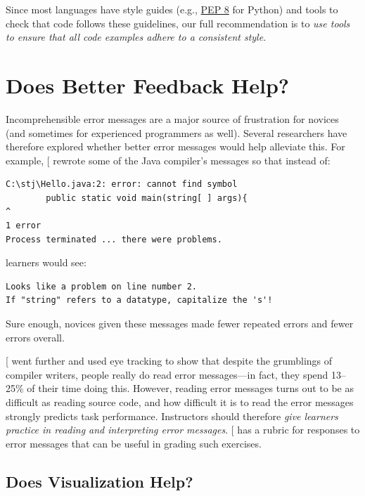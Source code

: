 Since most languages have style guides (e.g., \href{https://www.python.org/dev/peps/pep-0008/}{PEP 8} for
Python) and tools to check that code follows these guidelines, our
full recommendation is to \emph{use tools to ensure that all code examples
adhere to a consistent style}.

\section{Does Better Feedback Help?}\label{s:pck-error}

Incomprehensible error messages are a major source of frustration for
novices (and sometimes for experienced programmers as well). Several
researchers have therefore explored whether better error messages would
help alleviate this. For example, {[}\protect[\hyperlink{b:Beck2016}{Beck2016}]{]} rewrote some of the
Java compiler's messages so that instead of:

\begin{lstlisting}
C:\stj\Hello.java:2: error: cannot find symbol
        public static void main(string[ ] args){
^
1 error
Process terminated ... there were problems.
\end{lstlisting}

learners would see:

\begin{lstlisting}
Looks like a problem on line number 2.
If "string" refers to a datatype, capitalize the 's'!
\end{lstlisting}

Sure enough, novices given these messages made fewer repeated errors and
fewer errors overall.

{[}\protect[\hyperlink{b:Bari2017}{Bari2017}]{]} went further and used eye tracking to show that
despite the grumblings of compiler writers, people really do read error
messages---in fact, they spend 13--25\% of their time doing this. However,
reading error messages turns out to be as difficult as reading source
code, and how difficult it is to read the error messages strongly
predicts task performance. Instructors should therefore \emph{give learners
practice in reading and interpreting error messages}. {[}\protect[\hyperlink{b:Marc2011}{Marc2011}]{]}
has a rubric for responses to error messages that can be useful in
grading such exercises.

\subsection{Does Visualization Help?}\label{does-visualization-help}

